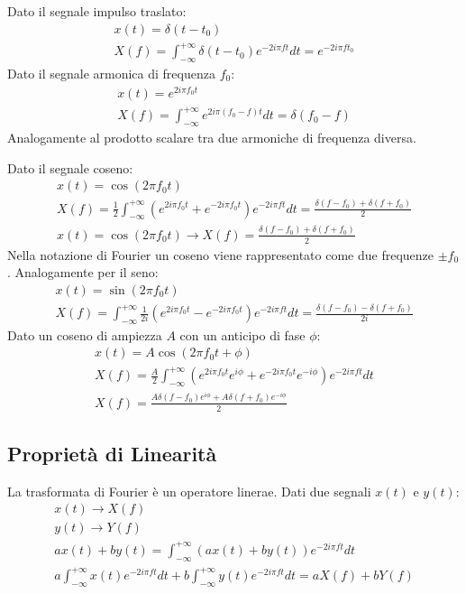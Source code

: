 \documentclass{article}
\numberwithin{equation}{subsection}
\begin{document}
Dato il segnale impulso traslato:
\begin{gather*}
    x(t)=\delta (t-t_0)\\
    X(f)=\displaystyle\int_{-\infty}^{+\infty}\delta(t-t_0)e^{-2i\pi ft}dt=e^{-2i\pi ft_0}
\end{gather*}
Dato il segnale armonica di frequenza $f_0$:
\begin{gather*}
    x(t)=e^{2i\pi f_0t}\\
    X(f)=\displaystyle\int_{-\infty}^{+\infty}e^{2i\pi(f_0-f)t}dt=\delta(f_0-f)
\end{gather*}
Analogamente al prodotto scalare tra due armoniche di frequenza diversa. 


Dato il segnale coseno:
\begin{gather*}
    x(t)=\cos(2\pi f_0t)\\
    X(f)=\displaystyle\frac{1}{2}\int_{-\infty}^{+\infty}\left(e^{2i\pi f_0t}+e^{-2i\pi f_0t}\right)e^{-2i\pi ft}dt=\frac{\delta(f-f_0)+\delta(f+f_0)}{2}\\
    x(t)=\cos(2\pi f_0t)\rightarrow X(f)=\displaystyle\frac{\delta(f-f_0)+\delta(f+f_0)}{2}
\end{gather*}
Nella notazione di Fourier un coseno viene rappresentato come due frequenze $\pm f_0$. 
Analogamente per il seno:
\begin{gather*}
    x(t)=\sin(2\pi f_0t)\\
    X(f)=\displaystyle\int_{-\infty}^{+\infty}\frac{1}{2i}(e^{2i\pi f_0t}-e^{-2i\pi f_0t})e^{-2i\pi ft}dt=\frac{\delta (f-f_0)-\delta(f+f_0)}{2i}
\end{gather*}
Dato un coseno di ampiezza $A$ con un anticipo di fase $\phi$: 
\begin{gather*}
    x(t)=A\cos(2\pi f_0t+\phi)\\
    X(f)=\displaystyle\frac{A}{2}\int_{-\infty}^{+\infty}\left(e^{2i\pi f_0t}e^{i\phi}+e^{-2i\pi f_0t}e^{-i\phi}\right)e^{-2i\pi ft}dt\\
    X(f)=\frac{A\delta(f-f_0)e^{i\phi}+A\delta(f+f_0)e^{-i\phi}}{2}
\end{gather*}

\subsection{Proprietà di Linearità}

La trasformata di Fourier è un operatore linerae. Dati due segnali $x(t)$ e $y(t)$:
\begin{gather*}
    x(t)\to X(f)\\
    y(t)\to Y(f)\\
    ax(t)+by(t)=\displaystyle\int_{-\infty}^{+\infty}(ax(t)+by(t))e^{-2i\pi ft}dt\\
    a\int_{-\infty}^{+\infty}x(t)e^{-2i\pi ft}dt+b\int_{-\infty}^{+\infty}y(t)e^{-2i\pi ft}dt= 
    aX(f)+bY(f)
\end{gather*}
\end{document}
